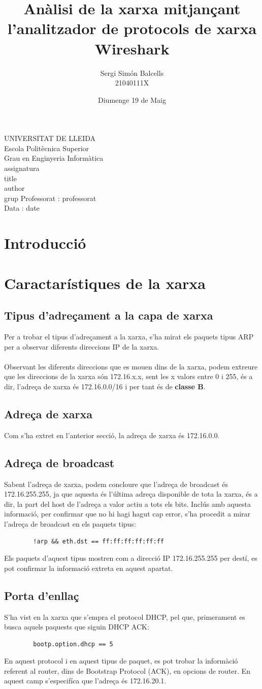 \documentclass{article}
\title{Anàlisi de la xarxa mitjançant l'analitzador de protocols de xarxa Wireshark}
\author{Sergi Simón Balcells\\21040111X}
\date{Diumenge 19 de Maig}
\renewcommand{\maketitle}{ %
    \begin{titlepage}
        \raggedright{UNIVERSITAT DE LLEIDA \\
            Escola Politècnica Superior \\
            Grau en Enginyeria Informàtica\\
            \1assignatura\\}
            \vspace{5cm}
            \centering\huge{\5title \\}
            \vspace{3cm}
            \large{\6author} \\
            \normalsize{\3grup}
            \vfill
            Professorat : \4professorat \\
            Data : \7date
\end{titlepage}}
\begin{document}
\maketitle
\thispagestyle{empty}

\newpage
{}
\tableofcontents
\listoffigures
\listoftables
\newpage
{}
\section{Introducció}
\section{Caractarístiques de la xarxa}
\subsection{Tipus d'adreçament a la capa de xarxa}
Per a trobar el tipus d'adreçament a la xarxa, s'ha mirat els paquets
tipus ARP per a observar diferents direccions IP de la xarxa.\\
\\
Observant les diferents direccions que es mouen dins de la xarxa, podem
extreure que les direccions de la xarxa són 172.16.x.x, sent les x valors
entre 0 i 255, és a dir, l'adreça de xarxa és 172.16.0.0/16 i per tant
és de  \textbf{classe B}.
\subsection{Adreça de xarxa}
Com s'ha extret en l'anterior secció, la adreça de xarxa és 172.16.0.0.
\subsection{Adreça de broadcast}
Sabent l'adreça de xarxa, podem concloure que
l'adreça de broadcast és 172.16.255.255, ja que aquesta és l'última adreça
disponible de tota la xarxa, és a dir, la part del host de l'adreça a valor
actiu a tots els bits. Inclús amb aquesta informació, per confirmar que no
hi hagi hagut cap error, s'ha procedit a mirar l'adreça de broadcast en els
paquets tipus:\\
\begin{lstlisting}
	    !arp && eth.dst == ff:ff:ff:ff:ff:ff
\end{lstlisting}
Els paquets d'aquest tipus mostren com a direcció IP 172.16.255.255 per destí,
es pot confirmar la informació extreta en aquest apartat.
\subsection{Porta d'enllaç}
S'ha vist en la xarxa que s'empra el protocol DHCP, pel que, primerament
es busca aquels paquests que siguin DHCP ACK:\\
\begin{lstlisting}
		bootp.option.dhcp == 5
\end{lstlisting}
En aquest protocol i en aquest tipus de paquet, es pot trobar la informàció
referent al router,  dins de Bootstrap Protocol (ACK), en opcions de router.
En aquest camp s'especifíca que l'adreça és 172.16.20.1.
\end{document}
